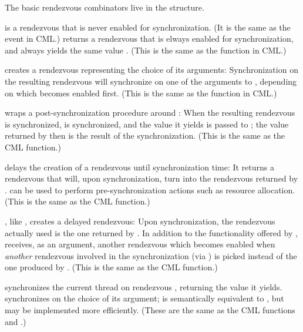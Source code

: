 The basic rendezvous combinators live in the 
structure.
%
\begin{protos}
\end{protos}
%
 is a rendezvous that is never enabled for
synchronization.  (It is the same as the  event in CML.)
 returns a rendezvous that is elways enabled for
synchronization, and always yields the same value .  (This
is the same as the  function in CML.)
%
\begin{protos}
\end{protos}
%
 creates a rendezvous representing the choice of its
arguments:  Synchronization on the resulting rendezvous will
synchronize on one of the arguments to , depending on
which becomes enabled first.  (This is the same as the 
function in CML.)
%
\begin{protos}
\end{protos}
%
 wraps a post-synchronization procedure around :
When the resulting rendezvous is synchronized,  is
synchronized, and the value it yields is passed to ; the
value returned by  then is the result of the
synchronization.  (This is the same as the CML  function.)
%
\begin{protos}
\end{protos}
%
 delays the creation of a rendezvous until synchronization
time: It returns a rendezvous that will, upon synchronization, turn
into the rendezvous returned by .   can be
used to perform pre-synchronization actions such as resource
allocation.  (This is the same as the CML  function.)
%
\begin{protos}
\end{protos}
%
, like , creates a delayed rendezvous: Upon
synchronization, the rendezvous actually used is the one returned by
.  In addition to the functionality offered by
,  receives, as an argument, another rendezvous
which becomes enabled when \emph{another} rendezvous involved in the
synchronization (via ) is picked instead of the one
produced by .  (This is the same as the CML 
function.)
%
\begin{protos}
\end{protos}
%
 synchronizes the current thread on rendezvous
, returning the value it yields.  
synchronizes on the choice of its argument;  is semantically equivalent to , but may be implemented more efficiently.  (These are the
same as the CML functions  and .)

